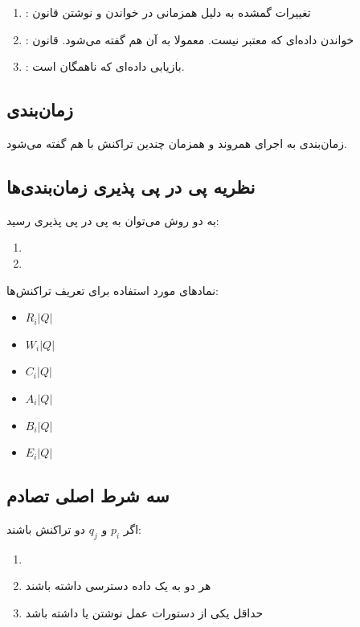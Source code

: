 \documentclass[20pt, a4paper]{article}
\begin{document}
\begin{enumerate}
    \item {}: تغییرات گمشده به دلیل همزمانی در خواندن و نوشتن
    قانون 
    \item {}: خواندن داده‌ای که معتبر نیست. معمولا به آن  هم گفته می‌شود. قانون 
    \item {}: بازیابی داده‌ای که ناهمگان است. 
\end{enumerate}

\subsection{زمان‌بندی}

زمان‌بندی به اجرای همروند و همزمان چندین تراکنش با هم گفته می‌شود.

\subsection{نظریه پی در پی پذیری زمان‌بندی‌ها}

به دو روش می‌توان به پی در پی پذیری رسید:

\begin{enumerate}
    \item {}
    \item {}
\end{enumerate}

نماد‌های مورد استفاده برای تعریف تراکنش‌ها:

\begin{itemize}
    \item $R_{i}| Q |$
    \item $W_{i}| Q |$
    \item $C_{i}| Q |$
    \item $A_{i}| Q |$
    \item $B_{i}| Q |$
    \item $E_{i}| Q |$
\end{itemize}

\subsection{سه شرط اصلی تصادم}

اگر $p_{i}$ و $q_{j}$ دو تراکنش باشند:

\begin{enumerate}
    \item {}
    \item هر دو به یک داده دسترسی داشته باشند
    \item حداقل یکی از دستورات عمل نوشتن یا  داشته باشد
\end{enumerate}
\end{document}
